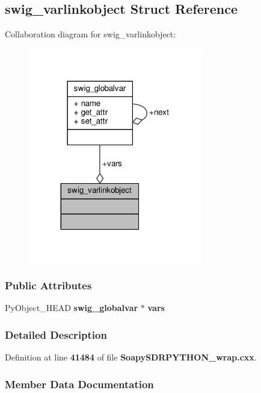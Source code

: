 \subsection{swig\+\_\+varlinkobject Struct Reference}
\label{structswig__varlinkobject}


Collaboration diagram for swig\+\_\+varlinkobject\+:
\nopagebreak
\begin{figure}[H]
\begin{center}
\leavevmode
\includegraphics[width=215pt]{d4/d5d/structswig__varlinkobject__coll__graph}
\end{center}
\end{figure}
\subsubsection*{Public Attributes}
\begin{DoxyCompactItemize}
\item 
Py\+Object\+\_\+\+H\+E\+AD {\bf swig\+\_\+globalvar} $\ast$ {\bf vars}
\end{DoxyCompactItemize}


\subsubsection{Detailed Description}


Definition at line {\bf 41484} of file {\bf Soapy\+S\+D\+R\+P\+Y\+T\+H\+O\+N\+\_\+wrap.\+cxx}.



\subsubsection{Member Data Documentation}
